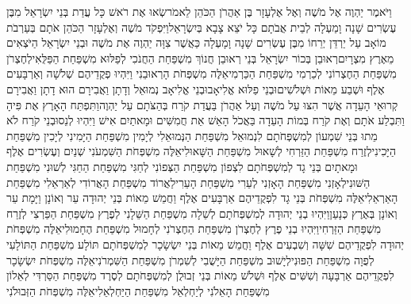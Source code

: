 \documentclass[../main/main.tex]{subfiles}
\begin{document}
\begin{multicols*}{\ncols}
וַיֹּאמֶר יַהְוֶה אֶל מֹשֶׁה וְאֶל אֶלְעָזָר בֶּן אַהֲרֹן הַכֹּהֵן לֵאמֹר\PreVerseSpace{}שְׂאוּ אֶת רֹאשׁ כָּל עֲדַת בְּנֵי יִשְׂרָאֵל מִבֶּן עֶשְׂרִים שָׁנָה וָמַעְלָה לְבֵית אֲבֹתָם כָּל יֹצֵא צָבָא בְּיִשְׂרָאֵל\PreVerseSpace{}וַיִּפְקֹד\SubEnd{} מֹשֶׁה וְאֶלְעָזָר הַכֹּהֵן אֹתָם בְּעַרְבֹת מוֹאָב עַל יַרְדֵּן יְרֵחוֹ \PreVerseSpace{}מִבֶּן עֶשְׂרִים שָׁנָה וָמָעְלָה כַּאֲשֶׁר צִוָּה יַהְוֶה אֶת מֹשֶׁה וּבְנֵי יִשְׂרָאֵל הַיֹּצְאִים מֵאֶרֶץ מִצְרָיִם\PreVerseSpace{}רְאוּבֵן בְּכוֹר יִשְׂרָאֵל בְּנֵי רְאוּבֵן חֲנוֹךְ מִשְׁפַּחַת הַחֲנֹכִי לְפַלּוּא מִשְׁפַּחַת הַפַּלֻּאִי\PreVerseSpace{}לְחֶצְרֹן מִשְׁפַּחַת הַחֶצְרוֹנִי לְכַרְמִי מִשְׁפַּחַת הַכַּרְמִי\PreVerseSpace{}אֵלֶּה מִשְׁפְּחֹת הָרְאוּבֵנִי וַיִּהְיוּ פְקֻדֵיהֶם שְׁלֹשָׁה וְאַרְבָּעִים אֶלֶף וּשְׁבַע מֵאוֹת וּשְׁלֹשִׁים\PreVerseSpace{}וּבְנֵי פַלּוּא אֱלִיאָב\PreVerseSpace{}וּבְנֵי אֱלִיאָב נְמוּאֵל וְדָתָן וַאֲבִירָם הוּא דָתָן וַאֲבִירָם קְרוּאֵי הָעֵדָה אֲשֶׁר הִצּוּ עַל מֹשֶׁה וְעַל אַהֲרֹן בַּעֲדַת קֹרַח בְּהַצֹּתָם עַל יַהְוֶה\PreVerseSpace{}וַתִּפְתַּח הָאָרֶץ אֶת פִּיהָ וַתִּבְלַע אֹתָם וְאֶת קֹרַח בְּמוֹת הָעֵדָה בַּאֲכֹל הָאֵשׁ אֵת חֲמִשִּׁים וּמָאתַיִם אִישׁ וַיִּהְיוּ לְנֵס\PreVerseSpace{}וּבְנֵי קֹרַח לֹא מֵתוּ \ClosedSection{}בְּנֵי שִׁמְעוֹן לְמִשְׁפְּחֹתָם לִנְמוּאֵל מִשְׁפַּחַת הַנְּמוּאֵלִי לְיָמִין מִשְׁפַּחַת הַיָּמִינִי לְיָכִין מִשְׁפַּחַת הַיָּכִינִי\PreVerseSpace{}לְזֶרַח מִשְׁפַּחַת הַזַּרְחִי לְשָׁאוּל מִשְׁפַּחַת הַשָּׁאוּלִי\PreVerseSpace{}אֵלֶּה מִשְׁפְּחֹת הַשִּׁמְעֹנִי שְׁנַיִם וְעֶשְׂרִים אֶלֶף וּמָאתָיִם \ClosedSection{}בְּנֵי גָד לְמִשְׁפְּחֹתָם לִצְפוֹן מִשְׁפַּחַת הַצְּפוֹנִי לְחַגִּי מִשְׁפַּחַת הַחַגִּי לְשׁוּנִי מִשְׁפַּחַת הַשּׁוּנִי\PreVerseSpace{}לְאָזְנִי מִשְׁפַּחַת הָאָזְנִי לְעֵרִי מִשְׁפַּחַת הָעֵרִי\PreVerseSpace{}לַאֲרוֹד מִשְׁפַּחַת הָאֲרוֹדִי לְאַרְאֵלִי מִשְׁפַּחַת הָאַרְאֵלִי\PreVerseSpace{}אֵלֶּה מִשְׁפְּחֹת בְּנֵי גָד לִפְקֻדֵיהֶם אַרְבָּעִים אֶלֶף וַחֲמֵשׁ מֵאוֹת \ClosedSection{}בְּנֵי יְהוּדָה עֵר וְאוֹנָן וַיָּמָת עֵר וְאוֹנָן בְּאֶרֶץ כְּנָעַן\PreVerseSpace{}וַיִּהְיוּ בְנֵי יְהוּדָה לְמִשְׁפְּחֹתָם לְשֵׁלָה מִשְׁפַּחַת הַשֵּׁלָנִי לְפֶרֶץ מִשְׁפַּחַת הַפַּרְצִי לְזֶרַח מִשְׁפַּחַת הַזַּרְחִי\PreVerseSpace{}וַיִּהְיוּ בְנֵי פֶרֶץ לְחֶצְרֹן מִשְׁפַּחַת הַחֶצְרֹנִי לְחָמוּל מִשְׁפַּחַת הֶחָמוּלִי\PreVerseSpace{}אֵלֶּה מִשְׁפְּחֹת יְהוּדָה לִפְקֻדֵיהֶם שִׁשָּׁה וְשִׁבְעִים אֶלֶף וַחֲמֵשׁ מֵאוֹת \ClosedSection{}בְּנֵי יִשְׂשָׂכָר לְמִשְׁפְּחֹתָם תּוֹלָע מִשְׁפַּחַת הַתּוֹלָעִי לְפֻוָה מִשְׁפַּחַת הַפּוּנִי\PreVerseSpace{}לְיָשׁוּב מִשְׁפַּחַת הַיָּשֻׁבִי לְשִׁמְרֹן מִשְׁפַּחַת הַשִּׁמְרֹנִי\PreVerseSpace{}אֵלֶּה מִשְׁפְּחֹת יִשְׂשָׂכָר לִפְקֻדֵיהֶם אַרְבָּעָה וְשִׁשִּׁים אֶלֶף וּשְׁלֹשׁ מֵאוֹת \ClosedSection{}בְּנֵי זְבוּלֻן לְמִשְׁפְּחֹתָם לְסֶרֶד מִשְׁפַּחַת הַסַּרְדִּי לְאֵלוֹן מִשְׁפַּחַת הָאֵלֹנִי לְיַחְלְאֵל מִשְׁפַּחַת הַיַּחְלְאֵלִי\PreVerseSpace{}אֵלֶּה מִשְׁפְּחֹת הַזְּבוּלֹנִי 
\end{multicols*}
\end{document}
